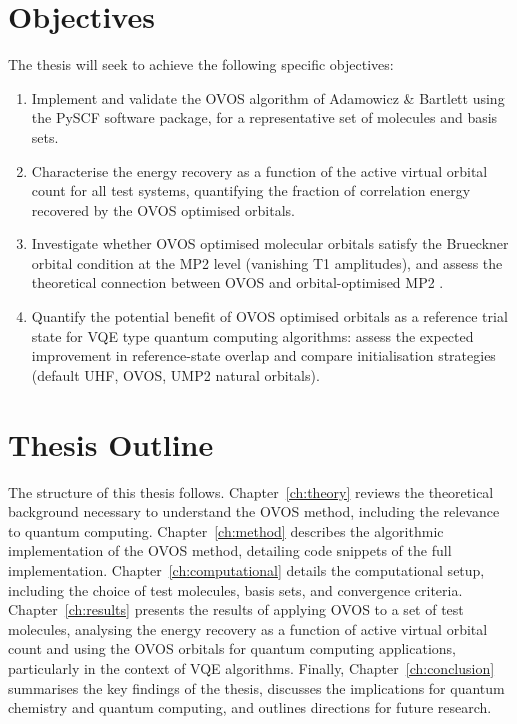 \section{Objectives}
\label{sec:int_objectives}
The thesis will seek to achieve the following specific objectives:

\begin{enumerate}
    \item Implement and validate the OVOS algorithm of Adamowicz \& Bartlett \cite{Adamowicz1987} using the PySCF software package, for a representative set of molecules and basis sets.
    \item Characterise the energy recovery as a function of the active virtual orbital count for all test systems, quantifying the fraction of correlation energy recovered by the OVOS optimised orbitals.
    \item Investigate whether OVOS optimised molecular orbitals satisfy the Brueckner orbital condition at the MP2 level (vanishing T1 amplitudes), and assess the theoretical connection between OVOS and orbital-optimised MP2 \cite{Lee2018}.
    \item Quantify the potential benefit of OVOS optimised orbitals as a reference trial state for VQE type quantum computing algorithms: assess the expected improvement in reference-state overlap and compare initialisation strategies (default UHF, OVOS, UMP2 natural orbitals).
\end{enumerate}


\section{Thesis Outline}
\label{sec:int_outline}

The structure of this thesis follows. Chapter~\ref{ch:theory} reviews the theoretical background necessary to understand the OVOS method, including the relevance to quantum computing. Chapter~\ref{ch:method} describes the algorithmic implementation of the OVOS method, detailing code snippets of the full implementation. Chapter~\ref{ch:computational} details the computational setup, including the choice of test molecules, basis sets, and convergence criteria. Chapter~\ref{ch:results} presents the results of applying OVOS to a set of test molecules, analysing the energy recovery as a function of active virtual orbital count and using the OVOS orbitals for quantum computing  applications, particularly in the context of VQE algorithms. Finally, Chapter~\ref{ch:conclusion} summarises the key findings of the thesis, discusses the implications for quantum chemistry and quantum computing, and outlines directions for future research.


